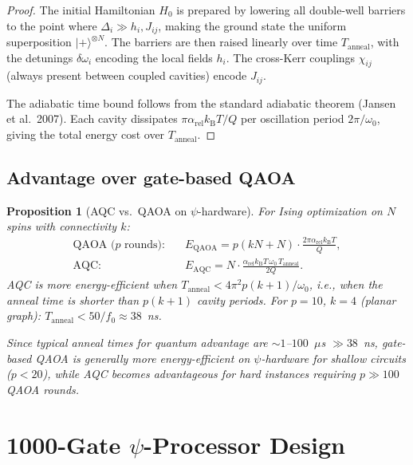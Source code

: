 \documentclass[11pt]{article}
\newtheorem{proposition}[theorem]{Proposition}
\theoremstyle{definition}
\theoremstyle{remark}
\newcommand{\kB}{k_{\mathrm{B}}}
\newcommand{\arel}{\alpha_{\mathrm{rel}}}
\begin{document}
\begin{proof}
The initial Hamiltonian $H_0$ is prepared by lowering all double-well
barriers to the point where $\Delta_i \gg h_i, J_{ij}$, making the ground
state the uniform superposition $|+\rangle^{\otimes N}$. The barriers are
then raised linearly over time $T_{\mathrm{anneal}}$, with the detunings
$\delta\omega_i$ encoding the local fields $h_i$. The cross-Kerr couplings
$\chi_{ij}$ (always present between coupled cavities) encode $J_{ij}$.

The adiabatic time bound follows from the standard adiabatic theorem
(Jansen et al.\ 2007). Each cavity dissipates $\pi\arel\kB T/Q$ per
oscillation period $2\pi/\omega_0$, giving the total energy cost over
$T_{\mathrm{anneal}}$.
\end{proof}

\subsection{Advantage over gate-based QAOA}

\begin{proposition}[AQC vs.\ QAOA on $\psi$-hardware]
For Ising optimization on $N$ spins with connectivity $k$:
\begin{align}
\text{QAOA ($p$ rounds):}&\quad E_{\mathrm{QAOA}} = p(kN+N)\cdot\frac{2\pi\arel\kB T}{Q}, \\
\text{AQC:}&\quad E_{\mathrm{AQC}} = N\cdot\frac{\arel\kB T\,\omega_0\,T_{\mathrm{anneal}}}{2Q}.
\end{align}
AQC is more energy-efficient when $T_{\mathrm{anneal}} < 4\pi^2 p(k+1)/\omega_0$,
i.e., when the anneal time is shorter than $p(k+1)$ cavity periods.
For $p = 10$, $k = 4$ (planar graph): $T_{\mathrm{anneal}} < 50/f_0 \approx 38$~ns.

Since typical anneal times for quantum advantage are $\sim 1$--$100$~$\mu$s
$\gg 38$~ns, gate-based QAOA is generally more energy-efficient on
$\psi$-hardware for shallow circuits ($p < 20$), while AQC becomes
advantageous for hard instances requiring $p \gg 100$ QAOA rounds.
\end{proposition}


\section{1000-Gate $\psi$-Processor Design}
\label{sec:1000-gate}
\end{document}
